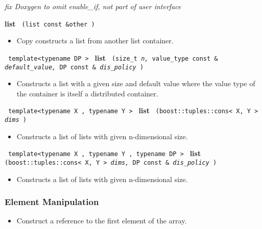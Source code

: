 \vspace{0.4cm} \emph{fix Doxygen to omit enable\_if, not part of user interface}
 
\noindent
\textbf{list}%
\texttt{%
(list const \&other
)
}

\begin{itemize}
\item
Copy constructs a list from another list container.
\end{itemize}
 
\noindent
\texttt{%
template<typename DP >
}
\newline
\textbf{list}%
\texttt{%
(size\_t 
\textit{n,}%
value\_type const \&
\textit{default\_value,}%
DP const \&
\textit{dis\_policy}%
)
}

\begin{itemize}
\item
Constructs a list with a given size and default value where the value type of the container is itself a distributed container. 
\end{itemize}
 
\noindent
\texttt{%
template<typename X , typename Y >
}
\newline
\textbf{list}%
\texttt{%
(boost::tuples::cons< X, Y > 
\textit{dims}%
)
}

\begin{itemize}
\item
Constructs a list of lists with given n-dimensional size. 
\end{itemize}
 
\noindent
\texttt{%
template<typename X , typename Y , typename DP >
}
\newline
\textbf{list}%
\texttt{%
(boost::tuples::cons< X, Y > 
\textit{dims,}%
DP const \&
\textit{dis\_policy}%
)
}

\begin{itemize}
\item
Constructs a list of lists with given n-dimensional size. 
\end{itemize}

\subsubsection{Element Manipulation}

\begin{itemize}
\item
Construct a reference to the first element of the array.
\end{itemize}
 
